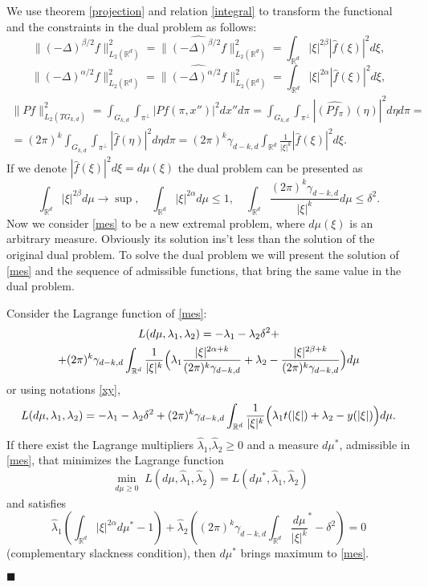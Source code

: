 \documentclass[12pt]{iopart}
\newenvironment{proof}
{\par\noindent{\bf Proof}}
{\hfill$\scriptstyle\blacksquare$}
\begin{document}
\begin{proof}
We use theorem \ref{projection} and relation \eqref{integral} to transform the functional and the constraints in the dual problem as follows: 
\[
  \|(-\Delta)^{\beta/2}f\|^2_{L_2(\mathbb R^d)}=\|\widehat{(-\Delta)^{\beta/2}f}\|^2_{L_2(\mathbb R^d)}=\int_{\mathbb R^d}|\xi|^{2\beta}|\widehat{f}(\xi )|^2d\xi,
\]
\[ \| (-\Delta)^{\alpha/2}f\|^2_{L_2(\mathbb R^d)}=\|\widehat{(-\Delta)^{\alpha/2}f}\|^2_{L_2(\mathbb R^d)}=\int_{\mathbb R^d}|\xi|^{2\alpha} |\widehat{f}(\xi)|^2d\xi,
\]
\begin{multline*}
  \|Pf\|^2_{L_2(TG_{k,d})}=\int_{G_{k,d}}\int_{\pi^\perp}|Pf(\pi,x'')|^2  dx''d\pi =
  \int_{G_{k,d}}\int_{\pi^\perp}|\widehat{(Pf_\pi)}(\eta)|^2  d\eta d\pi = \\
  =(2\pi)^{k}\int_{G_{k,d}}\int_{\pi^\perp}|\widehat
  f(\eta )|^2d\eta d\pi =
  (2\pi)^{k}\gamma_{d-k,d}\int_{\mathbb R^d}\frac{1}{|\xi|^k}|\widehat f(\xi )|^2d\xi.
\end{multline*}
If we denote $|\widehat f(\xi)|^2 d\xi =d\mu(\xi)$ the dual problem can be presented as
  \begin{equation}
  \label{mes}
  \int_{\mathbb R^d}|\xi|^{2\beta}d\mu\to \sup,\quad
  \int_{\mathbb R^d}|\xi|^{2\alpha}d\mu\leqslant  1,\quad\int_{\mathbb R^d}\frac{(2\pi)^{k}\gamma_{d-k,d}}{|\xi|^k}d\mu\leqslant \delta^2.
  \end{equation}
Now we consider \eqref{mes} to be a new extremal problem, where $d\mu(\xi)$ is an arbitrary measure. Obviously its solution ins't less than the solution of the original dual problem. To solve the dual problem we will present the solution of \eqref{mes} and the sequence of admissible functions, that bring the same value in the dual problem.

Consider the Lagrange function of \eqref{mes}:
 \begin{multline*}
L(d\mu ,\lambda_1,\lambda_2)=-\lambda_1-\lambda_2\delta^2+\\
  +(2\pi)^{k}\gamma_{d-k,d}\int_{\mathbb R^d}\frac{1}{|\xi|^k}\Bigl(\lambda_1\frac{|\xi|^{2\alpha+k}}{(2\pi)^{k}\gamma_{d-k,d}}+\lambda_2-\frac{|\xi|^{2\beta+k}}{(2\pi)^{k}\gamma_{d-k,d}}\Bigr)d\mu
\end{multline*}
or using notations \eqref{xy},
 $$
L(d\mu ,\lambda_1,\lambda_2)=-\lambda_1-\lambda_2\delta^2+(2\pi)^{k}\gamma_{d-k,d}\int_{\mathbb R^d}\frac{1}{|\xi|^k}\Bigl(\lambda_1t(|\xi|)+\lambda_2-y(|\xi|)\Bigr)d\mu.
$$
If there exist the Lagrange multipliers $\widehat\lambda_1$,$\widehat\lambda_2\ge 0$ and a measure $d\mu^*$, admissible in \eqref{mes}, that minimizes the Lagrange function
	$$\min_{
\begin{smallmatrix}
d\mu\ge 0
\end{smallmatrix}} L(d\mu,\widehat{\lambda}_1,\widehat{\lambda}_2)=L(d\mu^*,\widehat{\lambda}_1,\widehat{\lambda}_2)$$ and satisfies
$$
\widehat\lambda_1\left(\int_{\mathbb R^d}|\xi|^{2\alpha}d\mu^*-1\right)+\widehat\lambda_2\left((2\pi)^{k}\gamma_{d-k,d}\int_{\mathbb
    R^d}\frac{d\mu}{|\xi|^k}^*-\delta^2 \right)=0
$$
 (complementary slackness condition), then $d\mu^*$ brings maximum to \eqref{mes}. 


\end{proof}
\end{document}
